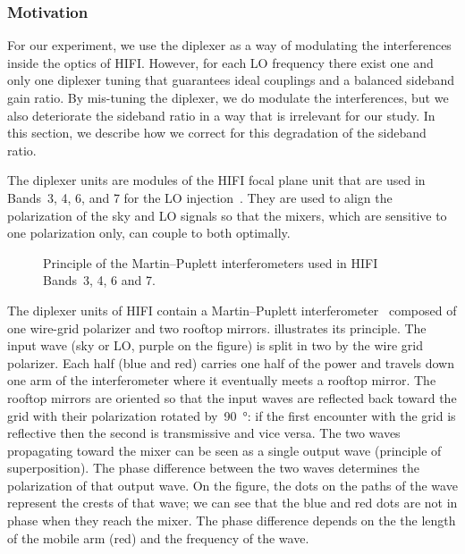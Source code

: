 \subsubsection{Motivation}
For our experiment, we use the diplexer as a way of modulating the interferences inside the optics of HIFI.
However, for each LO frequency there exist one and only one diplexer tuning that guarantees ideal couplings and a balanced sideband gain ratio.
By mis-tuning the diplexer, we do modulate the interferences, but we also deteriorate the sideband ratio in a way that is irrelevant for our study.
In this section, we describe how we correct for this degradation of the sideband ratio.

The diplexer units are modules of the HIFI focal plane unit that are used in Bands~3, 4, 6, and 7 for the LO injection~\parencite{jackson2002hifi}.
They are used to align the polarization of the sky and LO signals so that the mixers, which are sensitive to one polarization only, can couple to both optimally.

\begin{figure}
    \centering
    
    \caption{Principle of the Martin--Puplett interferometers used in HIFI Bands~3, 4, 6 and 7.}
    \label{fig:diplexer}
\end{figure}

The diplexer units of HIFI contain a Martin--Puplett interferometer~\parencite{martin1982polarizing} composed of one wire-grid polarizer and two rooftop mirrors.
 illustrates its principle.
The input wave (sky or LO, purple on the figure) is split in two by the wire grid polarizer.
Each half (blue and red) carries one half of the power and travels down one arm of the interferometer where it eventually meets a rooftop mirror.
The rooftop mirrors are oriented so that the input waves are reflected back toward the grid with their polarization rotated by~\SI{90}{\degree}: if the first encounter with the grid is reflective then the second is transmissive and vice versa.
The two waves propagating toward the mixer can be seen as a single output wave (principle of superposition).
The phase difference between the two waves determines the polarization of that output wave.
On the figure, the dots on the paths of the wave represent the crests of that wave;
we can see that the blue and red dots are not in phase when they reach the mixer.
The phase difference depends on the the length of the mobile arm (red) and the frequency of the wave.

